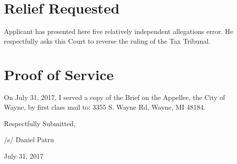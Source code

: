 \documentclass[12pt,\documentclassflag]{michiganCourtOfAppealsBrief}
\begin{document}
\section{Relief Requested}

Applicant has presented here five relatively independent allegations error. He respectfully asks this Court to reverse the ruling of the Tax Tribunal. 

\section{Proof of Service}

On July 31, 2017, I served a copy of the Brief on the Appellee, the City of Wayne, by first class mail to: 3355 S. Wayne Rd, Wayne, MI 48184. 


\vspace{1\baselineskip}

{ \setlength{\leftskip}{3.5in}

  Respectfully Submitted,

  /s/ Daniel Patru

  July 31, 2017

  \setlength{\leftskip}{0pt}}

\newpage\empty%
\end{document}
